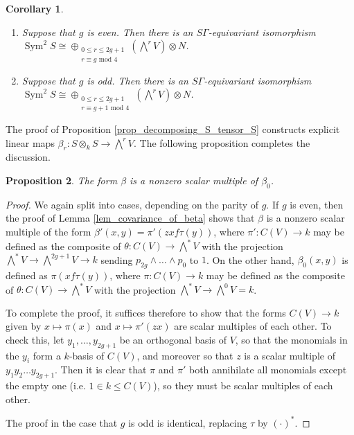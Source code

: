 \documentclass{article} %
\newtheorem{proposition}{Proposition}[section]
\newtheorem{corollary}[proposition]{Corollary}
\numberwithin{equation}{section}
\DeclareMathOperator{\Sym}{Sym}
\begin{document}
\begin{corollary}\label{cor_decomposing_symmetric_square_of_S}
    \begin{enumerate}
        \item Suppose that $g$ is even. Then there is an $S \Gamma$-equivariant isomorphism $\Sym^2 S \cong \oplus_{\substack{0 \leq r \leq 2g+1 \\ r \equiv g \text{ mod }4}} (\bigwedge^r V) \otimes N$.
        \item Suppose that $g$ is odd. Then there is an $S \Gamma$-equivariant isomorphism $\Sym^2 S \cong \oplus_{\substack{0 \leq r \leq 2g+1 \\ r \equiv g+1 \text{ mod }4}} (\bigwedge^r V) \otimes N$.
    \end{enumerate}
\end{corollary}
The proof of Proposition \ref{prop_decomposing_S_tensor_S} constructs explicit linear maps $\beta_r\colon S\otimes_kS\rightarrow \bigwedge^r V$.
The following proposition completes the discussion.
\begin{proposition}
    The form $\beta$ is a nonzero scalar multiple of $\beta_0$. 
\end{proposition}
\begin{proof}
    We again split into cases, depending on the parity of $g$. If $g$ is even, then the proof of Lemma \ref{lem_covariance_of_beta} shows that $\beta$ is a nonzero scalar multiple of the form $\beta'(x, y) = \pi'(z x f \tau(y))$, where $\pi' : C(V) \to k$ may be defined as the composite of $\theta : C(V) \to \bigwedge^\ast V$ with the projection $\bigwedge^\ast V \to \bigwedge^{2g+1} V \to k$ sending $p_{2g} \wedge \dots \wedge p_0$ to $1$. On the other hand, $\beta_0(x, y)$ is defined as $\pi( x f \tau(y))$, where $\pi : C(V) \to k$ may be defined as the composite of $\theta : C(V) \to \bigwedge^\ast V$ with the projection $\bigwedge^\ast V \to \bigwedge^0 V = k$. 

    To complete the proof, it suffices therefore to show that the forms $C(V) \to k$ given by $x \mapsto \pi(x)$ and $x \mapsto \pi'(zx)$ are scalar multiples of each other. To check this, let $y_1, \dots, y_{2g+1}$ be an orthogonal basis of $V$, so that the monomials in the $y_i$ form a $k$-basis of $C(V)$, and moreover so that $z$ is a scalar multiple of $y_1 y_2 \dots y_{2g+1}$. Then it is clear that $\pi$ and $\pi'$ both annihilate all monomials except the empty one (i.e. $1 \in k \leq C(V)$), so they must be scalar multiples of each other. 

    The proof in the case that $g$ is odd is identical, replacing $\tau$ by $(\cdot)^\ast$.
\end{proof}
\end{document}
